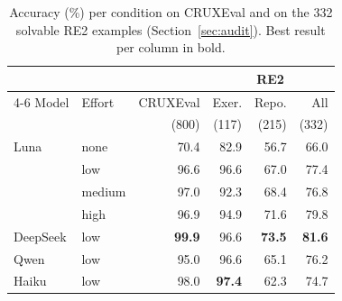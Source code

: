 \begin{table}[h]
\centering
\small
\setlength{\tabcolsep}{4pt}
\caption{Accuracy (\%) per condition on CRUXEval and on the 332 solvable RE2 examples (Section~\ref{sec:audit}). Best result per column in bold.}
\label{tab:accuracy}
\begin{tabular}{@{}llr|rrr@{}}
\toprule
 & & & \multicolumn{3}{c}{RE2} \\
\cmidrule(l){4-6}
Model & Effort & CRUXEval & Exer. & Repo. & All \\
 & & (800) & (117) & (215) & (332) \\
\midrule
Luna     & none   & 70.4 & 82.9 & 56.7 & 66.0 \\
         & low    & 96.6 & 96.6 & 67.0 & 77.4 \\
         & medium & 97.0 & 92.3 & 68.4 & 76.8 \\
         & high   & 96.9 & 94.9 & 71.6 & 79.8 \\
\midrule
DeepSeek & low    & \textbf{99.9} & 96.6 & \textbf{73.5} & \textbf{81.6} \\
Qwen     & low    & 95.0 & 96.6 & 65.1 & 76.2 \\
Haiku    & low    & 98.0 & \textbf{97.4} & 62.3 & 74.7 \\
\bottomrule
\end{tabular}
\end{table}

